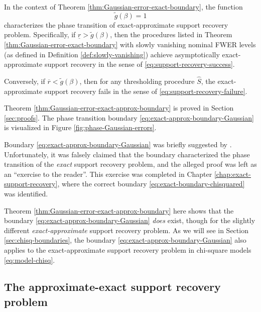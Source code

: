 \begin{theorem} \label{thm:Gaussian-error-exact-approx-boundary}
In the context of Theorem \ref{thm:Gaussian-error-exact-boundary}, the function 
\begin{equation} \label{eq:exact-approx-boundary-Gaussian}
    \widetilde{g}(\beta) = 1
\end{equation}
characterizes the phase transition of exact-approximate support recovery problem.
Specifically, if $\underline{r} > \widetilde{g}(\beta)$, then the procedures listed in Theorem \ref{thm:Gaussian-error-exact-boundary} with slowly vanishing nominal FWER levels (as defined in Definition \ref{def:slowly-vanishing}) achieve asymptotically exact-approximate support recovery in the sense of \eqref{eq:support-recovery-success}. 

Conversely, if $\overline{r} < \widetilde{g}(\beta)$, then for any thresholding procedure $\widehat{S}$, the exact-approximate support recovery fails in the sense of \eqref{eq:support-recovery-failure}.
\end{theorem}

Theorem \ref{thm:Gaussian-error-exact-approx-boundary} is proved in Section \ref{sec:proofs}. 
The phase transition boundary \eqref{eq:exact-approx-boundary-Gaussian} is visualized in Figure \ref{fig:phase-Gaussian-errors}.


\begin{remark}
Boundary \eqref{eq:exact-approx-boundary-Gaussian} was briefly suggested by \citet{arias2017distribution}.
Unfortunately, it was falsely claimed that the boundary characterized the phase transition of the \emph{exact} support recovery problem, and the alleged proof was left as an ``exercise to the reader''.
This exercise was completed in Chapter \ref{chap:exact-support-recovery}, where the correct boundary \eqref{eq:exact-boundary-chisquared} was identified. 

Theorem \ref{thm:Gaussian-error-exact-approx-boundary} here shows that the boundary \eqref{eq:exact-approx-boundary-Gaussian} \emph{does} exist, though for the slightly different \emph{exact-approximate} support recovery problem.
As we will see in Section \ref{sec:chisq-boundaries}, the boundary \eqref{eq:exact-approx-boundary-Gaussian} also applies to the exact-approximate support recovery problem in chi-square models \eqref{eq:model-chisq}.
\end{remark}

\subsection{The approximate-exact support recovery problem}
\label{subsec:aprox-exact-support-recovery-Gaussian}

